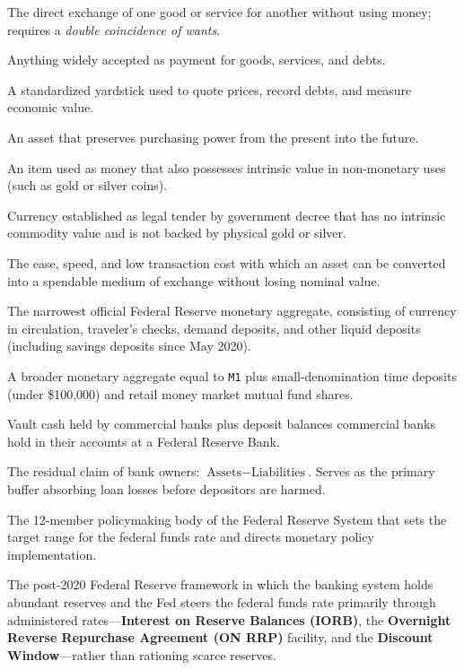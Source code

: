 \documentclass[11pt, oneside]{book}
\begin{document}
\begin{description}[leftmargin=1.5em, style=nextline, itemsep=4pt]
  \item[Barter] The direct exchange of one good or service for another without using money; requires a \emph{double coincidence of wants}.
  \item[Medium of Exchange] Anything widely accepted as payment for goods, services, and debts.
  \item[Unit of Account] A standardized yardstick used to quote prices, record debts, and measure economic value.
  \item[Store of Value] An asset that preserves purchasing power from the present into the future.
  \item[Commodity Money] An item used as money that also possesses intrinsic value in non-monetary uses (such as gold or silver coins).
  \item[Fiat Money] Currency established as legal tender by government decree that has no intrinsic commodity value and is not backed by physical gold or silver.
  \item[Liquidity] The ease, speed, and low transaction cost with which an asset can be converted into a spendable medium of exchange without losing nominal value.
  \item[M1] The narrowest official Federal Reserve monetary aggregate, consisting of currency in circulation, traveler's checks, demand deposits, and other liquid deposits (including savings deposits since May 2020).
  \item[M2] A broader monetary aggregate equal to \texttt{M1} plus small-denomination time deposits (under \$100,000) and retail money market mutual fund shares.
  \item[Reserves] Vault cash held by commercial banks plus deposit balances commercial banks hold in their accounts at a Federal Reserve Bank.
  \item[Bank Capital (Net Worth)] The residual claim of bank owners: $\text{Assets} - \text{Liabilities}$. Serves as the primary buffer absorbing loan losses before depositors are harmed.
  \item[Federal Open Market Committee (FOMC)] The 12-member policymaking body of the Federal Reserve System that sets the target range for the federal funds rate and directs monetary policy implementation.
  \item[Ample-Reserves Operating Regime] The post-2020 Federal Reserve framework in which the banking system holds abundant reserves and the Fed steers the federal funds rate primarily through administered rates---\textbf{Interest on Reserve Balances (IORB)}, the \textbf{Overnight Reverse Repurchase Agreement (ON RRP)} facility, and the \textbf{Discount Window}---rather than rationing scarce reserves.
\end{description}
\end{document}
